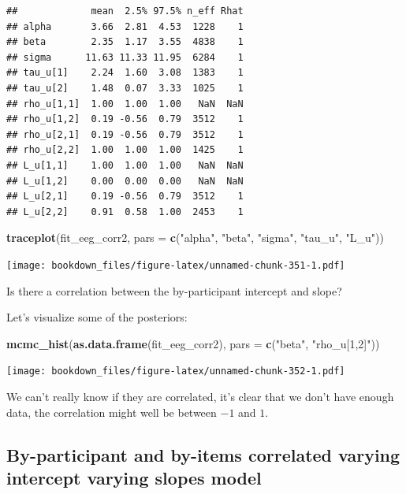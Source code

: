 \documentclass[12pt,]{krantz}
\newenvironment{Shaded}{\begin{snugshade}}{\end{snugshade}}
\newcommand{\DataTypeTok}[1]{\textcolor[rgb]{0.13,0.29,0.53}{#1}}
\newcommand{\KeywordTok}[1]{\textcolor[rgb]{0.13,0.29,0.53}{\textbf{#1}}}
\newcommand{\NormalTok}[1]{#1}
\newcommand{\StringTok}[1]{\textcolor[rgb]{0.31,0.60,0.02}{#1}}
\theoremstyle{definition}
\theoremstyle{definition}
\theoremstyle{definition}
\theoremstyle{remark}
\begin{document}
\begin{verbatim}
##             mean  2.5% 97.5% n_eff Rhat
## alpha       3.66  2.81  4.53  1228    1
## beta        2.35  1.17  3.55  4838    1
## sigma      11.63 11.33 11.95  6284    1
## tau_u[1]    2.24  1.60  3.08  1383    1
## tau_u[2]    1.48  0.07  3.33  1025    1
## rho_u[1,1]  1.00  1.00  1.00   NaN  NaN
## rho_u[1,2]  0.19 -0.56  0.79  3512    1
## rho_u[2,1]  0.19 -0.56  0.79  3512    1
## rho_u[2,2]  1.00  1.00  1.00  1425    1
## L_u[1,1]    1.00  1.00  1.00   NaN  NaN
## L_u[1,2]    0.00  0.00  0.00   NaN  NaN
## L_u[2,1]    0.19 -0.56  0.79  3512    1
## L_u[2,2]    0.91  0.58  1.00  2453    1
\end{verbatim}

\begin{Shaded}
\begin{Highlighting}[]
\KeywordTok{traceplot}\NormalTok{(fit_eeg_corr2, }\DataTypeTok{pars =}
                           \KeywordTok{c}\NormalTok{(}\StringTok{"alpha"}\NormalTok{, }\StringTok{"beta"}\NormalTok{, }\StringTok{"sigma"}\NormalTok{, }\StringTok{"tau_u"}\NormalTok{, }\StringTok{"L_u"}\NormalTok{))}
\end{Highlighting}
\end{Shaded}

\texttt{[image: bookdown\_files/figure-latex/unnamed-chunk-351-1.pdf]}

Is there a correlation between the by-participant intercept and slope?

Let's visualize some of the posteriors:

\begin{Shaded}
\begin{Highlighting}[]
\KeywordTok{mcmc_hist}\NormalTok{(}\KeywordTok{as.data.frame}\NormalTok{(fit_eeg_corr2),}
          \DataTypeTok{pars =} \KeywordTok{c}\NormalTok{(}\StringTok{"beta"}\NormalTok{, }\StringTok{"rho_u[1,2]"}\NormalTok{))}
\end{Highlighting}
\end{Shaded}

\texttt{[image: bookdown\_files/figure-latex/unnamed-chunk-352-1.pdf]}

We can't really know if they are correlated, it's clear that we don't have enough data, the correlation might well be between \(-1\) and \(1\).

\hypertarget{sec:crosscorrstan}{%
\subsection{By-participant and by-items correlated varying intercept varying slopes model}\label{sec:crosscorrstan}}
\end{document}
